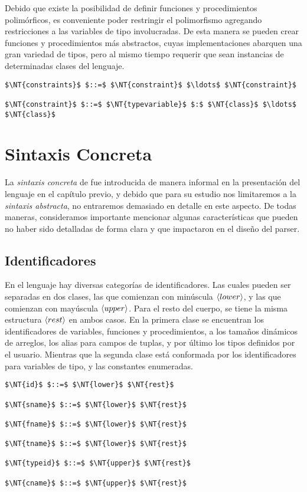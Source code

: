 Debido que existe la posibilidad de definir funciones y procedimientos polimórficos, es conveniente poder restringir el polimorfismo agregando restricciones a las variables de tipo involucradas.
De esta manera se pueden crear funciones y procedimientos más abstractos, cuyas implementaciones abarquen una gran variedad de tipos, pero al mismo tiempo requerir que sean instancias de determinadas clases del lenguaje.

\begin{lstlisting}[style = syntax]
$\NT{constraints}$ $::=$ $\NT{constraint}$ $\ldots$ $\NT{constraint}$

$\NT{constraint}$ $::=$ $\NT{typevariable}$ $:$ $\NT{class}$ $\ldots$ $\NT{class}$
\end{lstlisting}

\section{Sintaxis Concreta}

La \textit{sintaxis concreta} de \Lenguaje{} fue introducida de manera informal en la presentación del lenguaje en el capítulo previo, y debido que para su estudio nos limitaremos a la \textit{sintaxis abstracta}, no entraremos demasiado en detalle en este aspecto.
De todas maneras, consideramos importante mencionar algunas características que pueden no haber sido detalladas de forma clara y que impactaron en el diseño del parser.

\subsection{Identificadores}

En el lenguaje hay diversas categorías de identificadores.
Las cuales pueden ser separadas en dos clases, las que comienzan con minúscula $\langle lower \rangle$, y las que comienzan con mayúscula $\langle upper \rangle$.
Para el resto del cuerpo, se tiene la misma estructura $\langle rest \rangle$ en ambos casos.
En la primera clase se encuentran los identificadores de variables, funciones y procedimientos, a los tamaños dinámicos de arreglos, los alias para campos de tuplas, y por último los tipos definidos por el usuario.
Mientras que la segunda clase está conformada por los identificadores para variables de tipo, y las constantes enumeradas.

\begin{lstlisting}[style = syntax]
$\NT{id}$ $::=$ $\NT{lower}$ $\NT{rest}$

$\NT{sname}$ $::=$ $\NT{lower}$ $\NT{rest}$

$\NT{fname}$ $::=$ $\NT{lower}$ $\NT{rest}$

$\NT{tname}$ $::=$ $\NT{lower}$ $\NT{rest}$

$\NT{typeid}$ $::=$ $\NT{upper}$ $\NT{rest}$

$\NT{cname}$ $::=$ $\NT{upper}$ $\NT{rest}$
\end{lstlisting}

